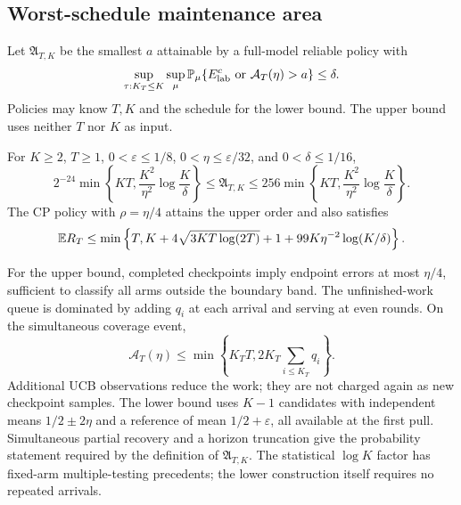 \documentclass[11pt]{article}
\begin{document}
\subsection{Worst-schedule maintenance area}

Let $\mathfrak A_{T,K}$ be the smallest $a$ attainable by a full-model reliable
policy with
\[
 \sup_{\tau:K_T\le K}\sup_\mu
 \mathbb P_\mu\{E_{\rm lab}^c\ \text{or}\ \mathcal A_T(\eta)>a\}\le\delta.
\]
Policies may know $T,K$ and the schedule for the lower bound. The upper bound
uses neither $T$ nor $K$ as input.

\begin{theorem}
\label{thm:worst_area}
For $K\ge2$, $T\ge1$, $0<\varepsilon\le1/8$,
$0<\eta\le\varepsilon/32$, and $0<\delta\le1/16$,
\begin{equation}
 2^{-24}\min\left\{KT,\frac{K^2}{\eta^2}\log\frac K\delta\right\}
 \le\mathfrak A_{T,K}\le
 256\min\left\{KT,\frac{K^2}{\eta^2}\log\frac K\delta\right\}.
 \label{eq:worst_area}
\end{equation}
The CP policy with $\rho=\eta/4$ attains the upper order and also satisfies
\begin{equation}
 \mathbb E R_T\le\min\left\{T,K+4\sqrt{3KT\log(2T)}+1+
                         99K\eta^{-2}\log(K/\delta)\right\}.
 \label{eq:joint_general}
\end{equation}
\end{theorem}

For the upper bound, completed checkpoints imply endpoint errors at most
$\eta/4$, sufficient to classify all arms outside the boundary band. The
unfinished-work queue is dominated by adding $q_i$ at each arrival and serving
at even rounds. On the simultaneous coverage event,
\begin{equation}
 \mathcal A_T(\eta)\le\min\left\{K_TT,
                         2K_T\sum_{i\le K_T}q_i\right\}.
 \label{eq:queue_upper}
\end{equation}
Additional UCB observations reduce the work; they are not charged again as
new checkpoint samples. The lower bound uses $K-1$ candidates with independent
means $1/2\pm2\eta$ and a reference of mean $1/2+\varepsilon$, all available
at the first pull. Simultaneous partial recovery and a horizon truncation give
the probability statement required by the definition of $\mathfrak A_{T,K}$.
The statistical $\log K$ factor has fixed-arm multiple-testing precedents;
the lower construction itself requires no repeated arrivals.
\end{document}
